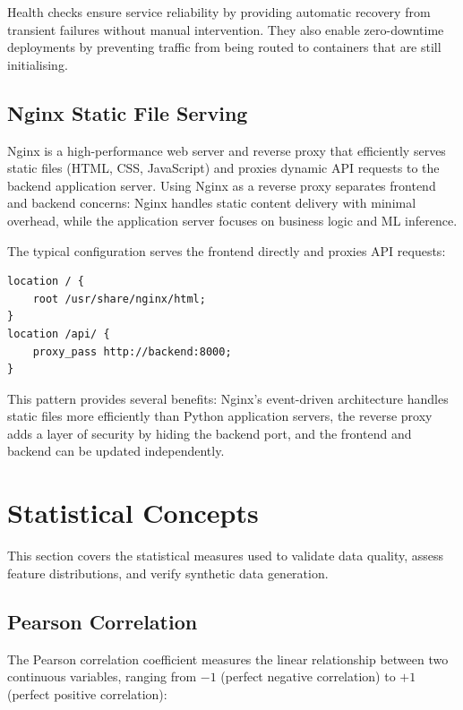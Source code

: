 \documentclass[10pt,a4paper]{article}
\begin{document}
Health checks ensure service reliability by providing automatic recovery from transient failures without manual intervention. They also enable zero-downtime deployments by preventing traffic from being routed to containers that are still initialising.

\subsection{Nginx Static File Serving}
\label{sec:nginx}

Nginx is a high-performance web server and reverse proxy that efficiently serves static files (HTML, CSS, JavaScript) and proxies dynamic API requests to the backend application server. Using Nginx as a reverse proxy separates frontend and backend concerns: Nginx handles static content delivery with minimal overhead, while the application server focuses on business logic and ML inference.

The typical configuration serves the frontend directly and proxies API requests:

\begin{lstlisting}[basicstyle=\ttfamily\small]
location / {
    root /usr/share/nginx/html;
}
location /api/ {
    proxy_pass http://backend:8000;
}
\end{lstlisting}

This pattern provides several benefits: Nginx's event-driven architecture handles static files more efficiently than Python application servers, the reverse proxy adds a layer of security by hiding the backend port, and the frontend and backend can be updated independently.

\section{Statistical Concepts}
\label{sec:statistics}

This section covers the statistical measures used to validate data quality, assess feature distributions, and verify synthetic data generation.

\subsection{Pearson Correlation}
\label{sec:pearson-correlation}

The Pearson correlation coefficient measures the linear relationship between two continuous variables, ranging from $-1$ (perfect negative correlation) to $+1$ (perfect positive correlation):
\end{document}
